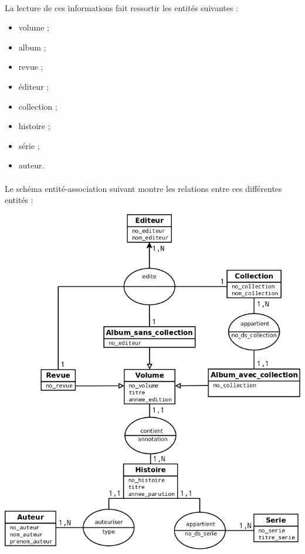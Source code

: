\documentclass[12pt]{report}
\begin{document}
\paragraph{}
La lecture de ces informations fait ressortir les entités suivantes :
\begin{itemize}
	\item volume ;
	\item album ;
	\item revue ;
	\item éditeur ;
	\item collection ;
	\item histoire ;
	\item série ;
	\item auteur.
\end{itemize}

\paragraph{}
Le schéma entité-association suivant montre les relations entre ces
différentes entités :

\noindent\includegraphics[width=\textwidth]{schema-entite-association}
\end{document}
